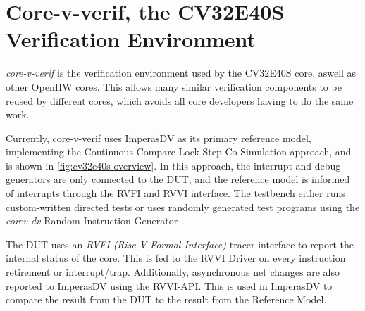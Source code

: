 %
%
%
%
%




\section{Core-v-verif, the CV32E40S Verification Environment}
\label{sec:bg_core-v-verif}

\textit{core-v-verif} \cite{openhwgroupOpenhwgroupCorevverif2023} is the verification environment used by the CV32E40S core, aswell as other OpenHW cores. This allows many similar verification components to be reused by different cores, which avoids all core developers having to do the same work.

Currently, core-v-verif uses ImperasDV as its primary reference model, implementing the Continuous Compare Lock-Step Co-Simulation approach\cite{duncangrahamRISCVVerificationImplications2023}, and is shown in \cref{fig:cv32e40s-overview}. In this approach, the interrupt and debug generators are only connected to the DUT, and the reference model is informed of interrupts through the RVFI and RVVI interface. 
The testbench either runs custom-written directed tests or uses randomly generated test programs using the \textit{corev-dv} Random Instruction Generator
\cite{openhwgroupOpenhwgroupCorevverif2023}.

The DUT uses an \textit{RVFI (Risc-V Formal Interface)} tracer interface to report the internal status of the core\cite{symbioticedaRiscvformalDocsRvfi2020}. This is fed to the RVVI Driver on every instruction retirement or interrupt/trap. Additionally, asynchronous net changes are also reported to ImperasDV using the RVVI-API. This is used in ImperasDV to compare the result from the DUT to the result from the Reference Model. 


